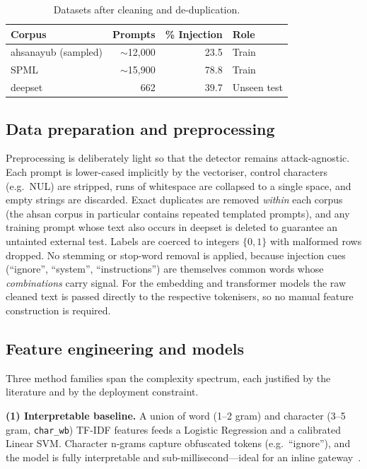 \documentclass[conference]{IEEEtran}
\begin{document}
\begin{table}[t]
\caption{Datasets after cleaning and de-duplication.}
\label{tab:data}
\centering
\small
\begin{tabular}{@{}lrrl@{}}
\toprule
Corpus & Prompts & \% Injection & Role \\
\midrule
ahsanayub (sampled) & $\sim$12{,}000 & 23.5 & Train \\
SPML & $\sim$15{,}900 & 78.8 & Train \\
deepset & 662 & 39.7 & Unseen test \\
\bottomrule
\end{tabular}
\end{table}

\subsection{Data preparation and preprocessing}
Preprocessing is deliberately light so that the detector remains
attack-agnostic. Each prompt is lower-cased implicitly by the vectoriser,
control characters (e.g.\ NUL) are stripped, runs of whitespace are collapsed to
a single space, and empty strings are discarded. Exact duplicates are removed
\emph{within} each corpus (the ahsan corpus in particular contains repeated
templated prompts), and any training prompt whose text also occurs in deepset is
deleted to guarantee an untainted external test. Labels are coerced to integers
$\{0,1\}$ with malformed rows dropped. No stemming or stop-word removal is
applied, because injection cues (``ignore'', ``system'', ``instructions'') are
themselves common words whose \emph{combinations} carry signal. For the
embedding and transformer models the raw cleaned text is passed directly to the
respective tokenisers, so no manual feature construction is required.

\subsection{Feature engineering and models}
Three method families span the complexity spectrum, each justified by the
literature and by the deployment constraint.

\textbf{(1) Interpretable baseline.} A union of word (1--2 gram) and character
(3--5 gram, \texttt{char\_wb}) TF-IDF features feeds a Logistic Regression and a
calibrated Linear SVM. Character n-grams capture obfuscated tokens (e.g.\
``ig\-nore''), and the model is fully interpretable and sub-millisecond---ideal
for an inline gateway~\cite{pedregosa2011scikit}.
\end{document}
